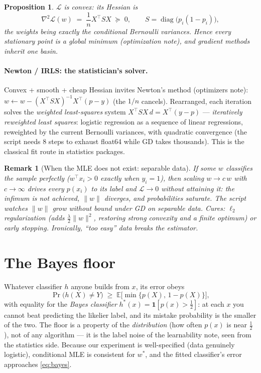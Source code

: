 \documentclass[11pt]{article}
\newtheorem{proposition}{Proposition}
\newtheorem{remark}{Remark}
\begin{document}
\begin{proposition}
$\mathcal{L}$ is convex: its Hessian is
\begin{equation}
  \nabla^2 \mathcal{L}(w)
  \;=\; \frac1n X^\top S X \;\succeq\; 0,
  \qquad
  S = \operatorname{diag}\bigl(p_i(1-p_i)\bigr),
  \label{eq:hessian}
\end{equation}
the weights being exactly the conditional Bernoulli variances. Hence
every stationary point is a global minimum (optimization note), and
gradient methods inherit one basin.
\end{proposition}

\paragraph{Newton / IRLS: the statistician's solver.}
Convex + smooth + cheap Hessian invites Newton's method
(optimizers note): $w \leftarrow w - (X^\top S X)^{-1} X^\top(p - y)$
(the $1/n$ cancels). Rearranged, each iteration solves the
\emph{weighted least-squares} system $X^\top S X\, d = X^\top (y - p)$
--- \emph{iteratively reweighted least squares}: logistic regression as a
sequence of linear regressions, reweighted by the current Bernoulli
variances, with quadratic convergence (the script needs 8 steps to
exhaust float64 while GD takes thousands). This is the classical fit
route in statistics packages.

\begin{remark}[When the MLE does not exist: separable data]
If some $w$ classifies the sample perfectly ($w^\top x_i > 0$ exactly
when $y_i = 1$), then scaling $w \to c\,w$ with $c\to\infty$ drives every
$p(x_i)$ to its label and $\mathcal{L} \to 0$ without attaining it: the
infimum is not achieved, $\lVert w\rVert$ diverges, and probabilities
saturate. The script watches $\lVert w\rVert$ grow without bound under GD
on separable data. Cures: $\ell_2$ regularization (adds
$\tfrac{\lambda}{2}\lVert w\rVert^2$, restoring strong convexity and a
finite optimum) or early stopping. Ironically, ``too easy'' data breaks
the estimator.
\end{remark}

\section{The Bayes floor}

Whatever classifier $h$ anyone builds from $x$, its error obeys
\begin{equation}
  \Pr\bigl(h(X) \ne Y\bigr)
  \;\ge\;
  \mathbb{E}\bigl[\min\{p(X),\, 1 - p(X)\}\bigr],
  \label{eq:bayes}
\end{equation}
with equality for the \emph{Bayes classifier}
$h^\ast(x) = \mathbf{1}[p(x) > \tfrac12]$: at each $x$ you cannot beat
predicting the likelier label, and its mistake probability is the smaller
of the two. The floor is a property of the \emph{distribution} (how often
$p(x)$ is near $\tfrac12$), not of any algorithm --- it is the label
noise of the learnability note, seen from the statistics side. Because
our experiment is well-specified (data genuinely logistic), conditional
MLE is consistent for $w^\ast$, and the fitted classifier's error
approaches \eqref{eq:bayes}.
\end{document}
